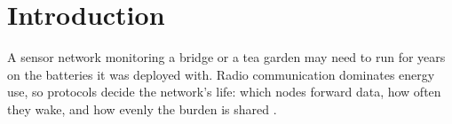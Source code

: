 \chapter{Introduction}
\label{ch:introduction}

A sensor network monitoring a bridge or a tea garden may need to run for years on the batteries
it was deployed with. Radio communication dominates energy use, so protocols decide the network's
life: which nodes forward data, how often they wake, and how evenly the burden is shared
\citep{akyildiz2002}.
